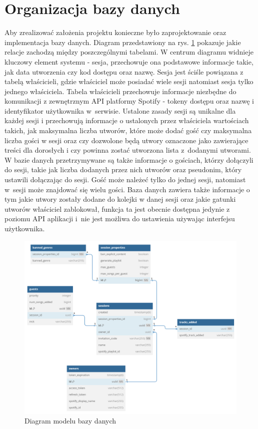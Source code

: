 \section{Organizacja bazy danych}
Aby zrealizować założenia projektu konieczne było zaprojektowanie oraz implementacja bazy danych. Diagram przedstawiony na rys. \ref{fig:database} pokazuje jakie relacje zachodzą między poszczególnymi tabelami. W centrum diagramu widnieje kluczowy element systemu - sesja, przechowuje ona podstawowe informacje takie, jak data utworzenia czy kod dostępu oraz nazwę. Sesja jest ściśle powiązana z tabelą właścicieli, gdzie właściciel może posiadać wiele sesji natomiast sesja tylko jednego właściciela. Tabela właścicieli przechowuje informacje niezbędne do komunikacji z zewnętrznym API platformy Spotify - tokeny dostępu oraz nazwę i identyfikator użytkownika w~serwisie. Ustalone zasady sesji są unikalne dla każdej sesji i przechowują informacje o ustalonych przez właściciela wartościach takich, jak maksymalna liczba utworów, które może dodać gość czy maksymalna liczba gości w sesji oraz czy dozwolone będą utwory oznaczone jako zawierające treści dla dorosłych i czy powinna zostać utworzona lista z~dodanymi utworami. W bazie danych przetrzymywane są także informacje o gościach, którzy dołączyli do sesji, takie jak liczba dodanych przez nich utworów oraz pseudonim, który ustawili dołączając do sesji. Gość może należeć tylko do jednej sesji, natomiast w~sesji może znajdować się wielu gości. Baza danych zawiera także informacje o tym jakie utwory zostały dodane do kolejki w danej sesji oraz jakie gatunki utworów właściciel zablokował, funkcja ta jest obecnie dostępna jedynie z poziomu API aplikacji i~nie jest możliwa do ustawienia używając interfejsu użytkownika.

\begin{figure}[h]
\centering
\includegraphics[width=1.0\textwidth]{./graf/database_diagram.png}
\caption{Diagram modelu bazy danych}
\label{fig:database}
\end{figure}

